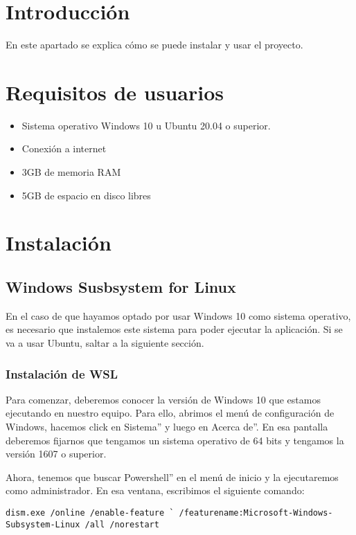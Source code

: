 
\section{Introducción}
En este apartado se explica cómo se puede instalar y usar el proyecto.

\section{Requisitos de usuarios}
\begin{itemize}
    \item Sistema operativo Windows 10 u Ubuntu 20.04 o superior.
    \item Conexión a internet
    \item 3GB de memoria RAM
    \item 5GB de espacio en disco libres
\end{itemize}

\section{Instalación}

\subsection{Windows Susbsystem for Linux}
En el caso de que hayamos optado por usar Windows 10 como sistema operativo, es necesario que instalemos este sistema para poder ejecutar la aplicación. Si se va a usar Ubuntu, saltar a la siguiente sección.

\subsubsection{Instalación de WSL}
Para comenzar, deberemos conocer la versión de Windows 10 que estamos ejecutando en nuestro equipo. Para ello, abrimos el menú de configuración de Windows, hacemos click en Sistema'' y luego en Acerca de''. En esa pantalla deberemos fijarnos que tengamos un sistema operativo de 64 bits y tengamos la versión 1607 o superior.

Ahora, tenemos que buscar Powershell'' en el menú de inicio y la ejecutaremos como administrador. En esa ventana, escribimos el siguiente comando:

\texttt{dism.exe /online /enable-feature \`{}\newline
/featurename:Microsoft-Windows-Subsystem-Linux /all /norestart}

